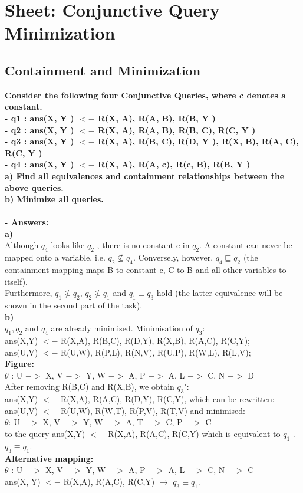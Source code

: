\documentclass{article}
\begin{document}
\section{Sheet: Conjunctive Query Minimization}
\subsection{Containment and Minimization}
\textbf{Consider the following four Conjunctive Queries, where c denotes a constant.\\
- q1 : ans(X, Y ) $<-$ R(X, A), R(A, B), R(B, Y )\\
- q2 : ans(X, Y ) $<-$ R(X, A), R(A, B), R(B, C), R(C, Y )\\
- q3 : ans(X, Y ) $<-$ R(X, A), R(B, C), R(D, Y ), R(X, B), R(A, C), R(C, Y )\\
- q4 : ans(X, Y ) $<-$ R(X, A), R(A, c), R(c, B), R(B, Y )\\
a) Find all equivalences and containment relationships between the above queries.\\
b) Minimize all queries.}\\\\
\textbf{- Answers: }\\
\textbf{a)}\\
Although $q_4$ looks like $q_2$ , there is no constant c in $q_2$. A constant can never be mapped onto a variable, i.e. $q_2 \nsubseteq q_4$. Conversely, however, $q_4 \sqsubseteq q_2$ (the containment mapping maps B to constant c, C to B and all other variables to itself).\\
Furthermore, $q_1 \nsubseteq q_2$, $q_2 \nsubseteq q_1$ and $q_1 \equiv q_3$ hold (the latter equivalence will be shown in the second part of the task).\\
\textbf{b)}\\
$q_1 , q_2$ and $q_4$ are already minimised. Minimisation of $q_3$:\\
ans(X,Y) $<-$ R(X,A), R(B,C), R(D,Y), R(X,B), R(A,C), R(C,Y);\\
ans(U,V) $<-$ R(U,W), R(P,L), R(N,V), R(U,P), R(W,L), R(L,V);\\
\textbf{Figure:}\\
$\theta$ : {U $->$ X, V $->$ Y, W $->$ A, P $->$ A, L $->$ C, N $->$ D}\\
After removing R(B,C) and R(X,B), we obtain $q_3'$:\\
ans(X,Y) $<-$ R(X,A), R(A,C), R(D,Y), R(C,Y), which can be rewritten:\\
ans(U,V) $<-$ R(U,W), R(W,T), R(P,V), R(T,V) and minimised:\\
$\theta$: {U $->$ X, V $->$ Y, W $->$ A, T $->$ C, P $->$ C}\\
to the query ans(X,Y) $<-$ R(X,A), R(A,C), R(C,Y) which is equivalent to $q_1$ .\\
$q_3 \equiv q_1$.\\
\textbf{Alternative mapping:}\\
$\theta$ : {U $->$ X, V $->$ Y, W $->$ A, P $->$ A, L $->$ C, N $->$ C}\\
ans(X, Y) $<-$ R(X,A), R(A,C), R(C,Y) $\rightarrow$ $q_3 \equiv q_1$.\\
\end{document}
